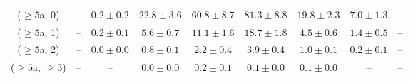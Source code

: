 \begin{table}[h!]
{\begin{tabular}{ccccccccc}
	($\ge5$a, 0) & -- & $0.2\pm 0.2$ & $22.8\pm 3.6$ & $60.8\pm 8.7$ & $81.3\pm 8.8$ & $19.8\pm 2.3$ & $7.0\pm 1.3$ & -- \\[0.5ex] 
	($\ge5$a, 1) & -- & $0.2\pm 0.1$ & $5.6\pm 0.7$ & $11.1\pm 1.6$ & $18.7\pm 1.8$ & $4.5\pm 0.6$ & $1.4\pm 0.5$ & -- \\[0.5ex] 
	($\ge5$a, 2) & -- & $0.0\pm 0.0$ & $0.8\pm 0.1$ & $2.2\pm 0.4$ & $3.9\pm 0.4$ & $1.0\pm 0.1$ & $0.2\pm 0.1$ & -- \\[0.5ex] 
	($\ge5$a, $\ge3$) & -- & -- & $0.0\pm 0.0$ & $0.2\pm 0.1$ & $0.1\pm 0.0$ & $0.1\pm 0.0$ & -- & -- \\[0.5ex] 
	\hline
	\hline
\end{tabular}}
\end{table}

